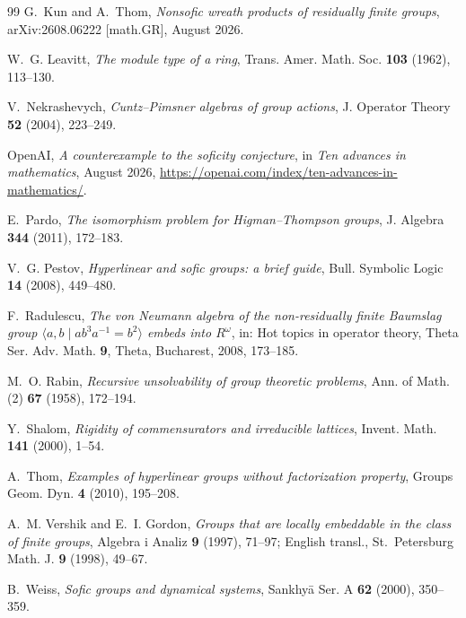 \documentclass[11pt]{amsart}
\theoremstyle{definition}
\theoremstyle{plain}
\begin{document}
\begin{thebibliography}{99}
G.~Kun and A.~Thom,
\emph{Nonsofic wreath products of residually finite groups},
arXiv:2608.06222 [math.GR], August 2026.

W.~G. Leavitt,
\emph{The module type of a ring},
Trans. Amer. Math. Soc. \textbf{103} (1962), 113--130.

V.~Nekrashevych,
\emph{Cuntz--Pimsner algebras of group actions},
J. Operator Theory \textbf{52} (2004), 223--249.

OpenAI,
\emph{A counterexample to the soficity conjecture},
in \emph{Ten advances in mathematics}, August 2026,
\url{https://openai.com/index/ten-advances-in-mathematics/}.

E.~Pardo,
\emph{The isomorphism problem for Higman--Thompson groups},
J. Algebra \textbf{344} (2011), 172--183.

V.~G. Pestov,
\emph{Hyperlinear and sofic groups: a brief guide},
Bull. Symbolic Logic \textbf{14} (2008), 449--480.

F.~Radulescu,
\emph{The von Neumann algebra of the non-residually finite Baumslag group
\(\langle a,b\mid ab^3a^{-1}=b^2\rangle\) embeds into \(R^\omega\)},
in: Hot topics in operator theory, Theta Ser. Adv. Math. \textbf{9},
Theta, Bucharest, 2008, 173--185.

M.~O. Rabin,
\emph{Recursive unsolvability of group theoretic problems},
Ann. of Math. (2) \textbf{67} (1958), 172--194.

Y.~Shalom,
\emph{Rigidity of commensurators and irreducible lattices},
Invent. Math. \textbf{141} (2000), 1--54.

A.~Thom,
\emph{Examples of hyperlinear groups without factorization property},
Groups Geom. Dyn. \textbf{4} (2010), 195--208.

A.~M. Vershik and E.~I. Gordon,
\emph{Groups that are locally embeddable in the class of finite groups},
Algebra i Analiz \textbf{9} (1997), 71--97;
English transl., St.~Petersburg Math. J. \textbf{9} (1998), 49--67.

B.~Weiss,
\emph{Sofic groups and dynamical systems},
Sankhy\=a Ser. A \textbf{62} (2000), 350--359.

\end{thebibliography}
\end{document}
